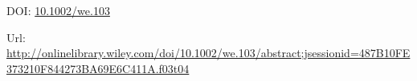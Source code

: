 \documentclass[a4paper,12pt]{article}
\newcommand{\doi}[1]{DOI: \href{https://doi.org/#1}{#1}}
\begin{document}
\thispagestyle{empty}

\vspace{3cm}

\nocite{FDB-art-6}
\printbibliography

\vspace{3cm}
\doi{10.1002/we.103}

\vspace{1.5cm}
Url: \url{http://onlinelibrary.wiley.com/doi/10.1002/we.103/abstract;jsessionid=487B10FE373210F844273BA69E6C411A.f03t04}

\newpage

\end{document}
